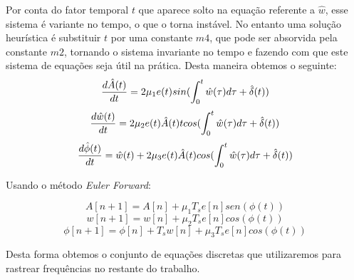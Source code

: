 \documentclass[a4paper, 12pt]{book}
\begin{document}
Por conta do fator temporal $t$ que aparece solto na equação referente a $\hat{w}$, esse sistema é variante no tempo, o que o torna instável. No entanto uma solução heurística é substituir $t$ por uma constante $m4$, que pode ser absorvida pela constante $m2$, tornando o sistema invariante no tempo e fazendo com que este sistema de equações seja útil na prática. Desta maneira obtemos o seguinte:
\begin{equation}
\frac{d\hat{A}(t)}{dt}=2\mu_1e(t)sin(\int_{0}^{t}\hat{w}(\tau)d\tau\space+\space\hat{\delta}(t))
\end{equation}
\begin{equation}
\frac{d\hat{w}(t)}{dt}=2\mu_2e(t)\hat{A}(t)tcos(\int_{0}^{t}\hat{w}(\tau)d\tau\space+\space\hat{\delta}(t))
\end{equation}
\begin{equation}
\frac{d\hat{\phi}(t)}{dt}=\hat{w}(t)+2\mu_3e(t)\hat{A}(t)cos(\int_{0}^{t}\hat{w}(\tau)d\tau\space+\space\hat{\delta}(t))
\end{equation}

Usando o método \textit{Euler Forward}:

\begin{equation}
A[n+1]=A[n]+\mu_1T_s e[n]sen(\phi(t))
\end{equation}
\begin{equation}
w[n+1]=w[n]+\mu_2T_s e[n]cos(\phi(t))
\end{equation}
\begin{equation}
\phi[n+1]=\phi[n] + T_s w[n] + \mu_3T_s e[n]cos(\phi(t))
\end{equation}

Desta forma obtemos o conjunto de equações discretas que utilizaremos para rastrear frequências no restante do trabalho.
\end{document}
